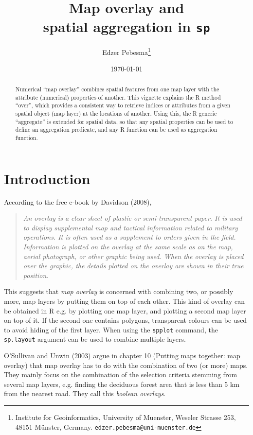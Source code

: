 \documentclass{article}
\title{\bf Map overlay and \\ spatial aggregation in {\tt sp}}
\author{Edzer Pebesma\footnote{Institute for Geoinformatics,
University of Muenster, Weseler Strasse 253, 48151 M\"{u}nster, Germany.
{\tt edzer.pebesma@uni-muenster.de}}}
\date{\today}
\begin{document}


\maketitle

\begin{abstract}
Numerical ``map overlay'' combines spatial features from one map
layer with the attribute (numerical) properties of another. This
vignette explains the R method ``over'', which provides a consistent
way to retrieve indices or attributes from a given spatial object
(map layer) at the locations of another. Using this, the R generic
``aggregate'' is extended for spatial data, so that any spatial
properties can be used to define an aggregation predicate, and
any R function can be used as aggregation function.
\end{abstract}

\tableofcontents

\section{Introduction}
According to the free e-book by Davidson (2008),
\begin{quotation} 
{\em An overlay is a clear sheet of plastic or semi-transparent paper. It
is used to display supplemental map and tactical information related
to military operations. It is often used as a supplement to orders
given in the field. Information is plotted on the overlay at the
same scale as on the map, aerial photograph, or other graphic being
used. When the overlay is placed over the graphic, the details
plotted on the overlay are shown in their true position. }
\end{quotation}
This suggests that {\em map overlay} is concerned with combining
two, or possibly more, map layers by putting them on top of each
other. This kind of overlay can be obtained in R e.g. by plotting
one map layer, and plotting a second map layer on top of it. If the
second one contains polygons, transparent colours can be used to
avoid hiding of the first layer. When using the {\tt spplot} command,
the {\tt sp.layout} argument can be used to combine multiple layers.

O'Sullivan and Unwin (2003) argue in chapter 10 (Putting maps
together: map overlay) that map overlay has to do with the
combination of two (or more) maps. They mainly focus on the
combination of the selection criteria stemming from several map
layers, e.g. finding the deciduous forest area that is less than
5 km from the nearest road. They call this {\em boolean overlays}.
\end{document}
